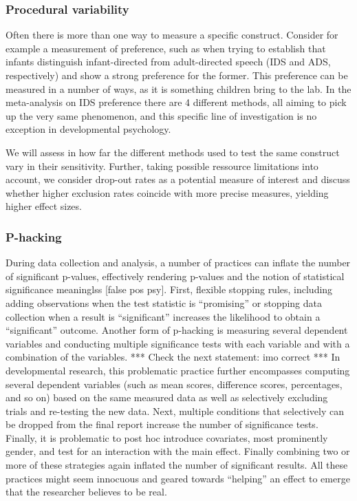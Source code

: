 \documentclass[english,floatsintext,man]{apa6}
\begin{document}
\subsubsection{Procedural variability}\label{procedural-variability}

Often there is more than one way to measure a specific construct.
Consider for example a measurement of preference, such as when trying to
establish that infants distinguish infant-directed from adult-directed
speech (IDS and ADS, respectively) and show a strong preference for the
former. This preference can be measured in a number of ways, as it is
something children bring to the lab. In the meta-analysis on IDS
preference there are 4 different methods, all aiming to pick up the very
same phenomenon, and this specific line of investigation is no exception
in developmental psychology.

We will assess in how far the different methods used to test the same
construct vary in their sensitivity. Further, taking possible ressource
limitations into account, we consider drop-out rates as a potential
measure of interest and discuss whether higher exclusion rates coincide
with more precise measures, yielding higher effect sizes.

\subsubsection{P-hacking}\label{p-hacking}

During data collection and analysis, a number of practices can inflate
the number of significant p-values, effectively rendering p-values and
the notion of statistical significance meaninglss {[}false pos psy{]}.
First, flexible stopping rules, including adding observations when the
test statistic is \enquote{promising} or stopping data collection when a
result is \enquote{significant} increases the likelihood to obtain a
\enquote{significant} outcome. Another form of p-hacking is measuring
several dependent variables and conducting multiple significance tests
with each variable and with a combination of the variables. *** Check
the next statement: imo correct *** In developmental research, this
problematic practice further encompasses computing several dependent
variables (such as mean scores, difference scores, percentages, and so
on) based on the same measured data as well as selectively excluding
trials and re-testing the new data. Next, multiple conditions that
selectively can be dropped from the final report increase the number of
significance tests. Finally, it is problematic to post hoc introduce
covariates, most prominently gender, and test for an interaction with
the main effect. Finally combining two or more of these strategies again
inflated the number of significant results. All these practices might
seem innocuous and geared towards \enquote{helping} an effect to emerge
that the researcher believes to be real.
\end{document}
